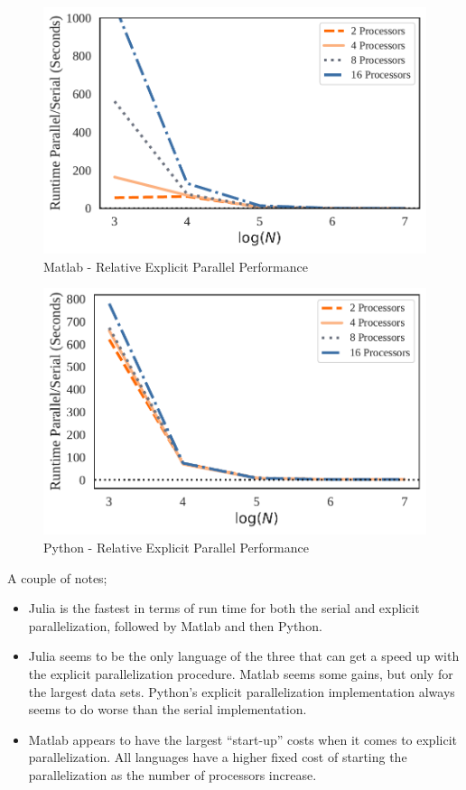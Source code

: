 \documentclass[a4paper, 12pt]{article}
\begin{document}
\begin{figure}[!ht]
    \centering
    \caption{Matlab - Relative Explicit Parallel Performance}
    \includegraphics[scale = 0.75]{../figs/matlabNormParFor.pdf}
\end{figure}


\begin{figure}[!ht]
    \centering
    \caption{Python - Relative Explicit Parallel Performance}
    \includegraphics[scale = 0.75]{../figs/pythonNormParFor.pdf}
\end{figure}

\pagebreak 

A couple of notes; 

\begin{itemize}
    \item Julia is the fastest in terms of run time for both the serial and explicit parallelization, followed by Matlab and then Python. 
    \item Julia seems to be the only language of the three that can get a speed up with the explicit parallelization procedure. Matlab seems some gains, but only for the largest data sets. Python's explicit parallelization implementation always seems to do worse than the serial implementation. 
    \item Matlab appears to have the largest ``start-up'' costs when it comes to explicit parallelization. All languages have a higher fixed cost of starting the parallelization as the number of processors increase. 
\end{itemize}
\end{document}
